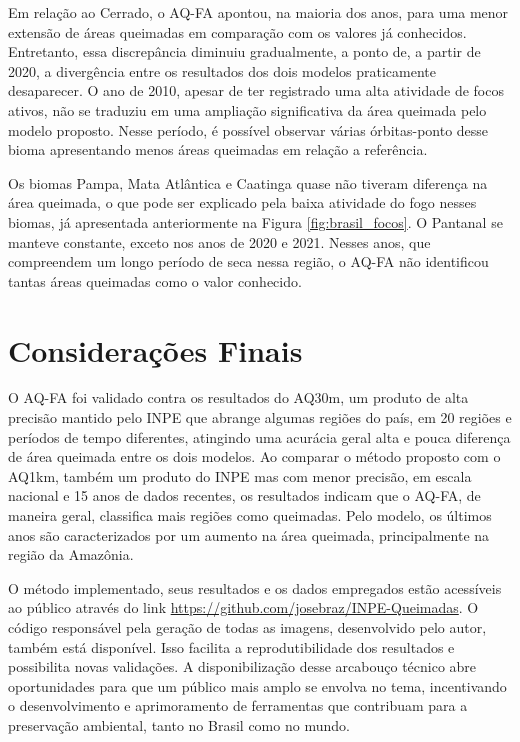 \documentclass[cic,tc]{iiufrgs}
\begin{document}
Em relação ao Cerrado, o AQ-FA apontou, na maioria dos anos, para uma menor extensão de áreas queimadas em comparação com os valores já conhecidos. Entretanto, essa discrepância diminuiu gradualmente, a ponto de, a partir de 2020, a divergência entre os resultados dos dois modelos praticamente desaparecer. O ano de 2010, apesar de ter registrado uma alta atividade de focos ativos, não se traduziu em uma ampliação significativa da área queimada pelo modelo proposto. Nesse período, é possível observar várias órbitas-ponto desse bioma apresentando menos áreas queimadas em relação a referência.

Os biomas Pampa, Mata Atlântica e Caatinga quase não tiveram diferença na área queimada, o que pode ser explicado pela baixa atividade do fogo nesses biomas, já apresentada anteriormente na Figura \ref{fig:brasil_focos}. O Pantanal se manteve constante, exceto nos anos de 2020 e 2021. Nesses anos, que compreendem um longo período de seca nessa região, o AQ-FA não identificou tantas áreas queimadas como o valor conhecido.



\chapter{Considerações Finais}
\label{chp:conclusa}



O AQ-FA foi validado contra os resultados do AQ30m, um produto de alta precisão mantido pelo INPE que abrange algumas regiões do país, em 20 regiões e períodos de tempo diferentes, atingindo uma acurácia geral alta e pouca diferença de área queimada entre os dois modelos. Ao comparar o método proposto com o AQ1km, também um produto do INPE mas com menor precisão, em escala nacional e 15 anos de dados recentes, os resultados indicam que o AQ-FA, de maneira geral, classifica mais regiões como queimadas. Pelo modelo, os últimos anos são caracterizados por um aumento na área queimada, principalmente na região da Amazônia.



O método implementado, seus resultados e os dados empregados estão acessíveis ao público através do link \url{https://github.com/josebraz/INPE-Queimadas}. O código responsável pela geração de todas as imagens, desenvolvido pelo autor, também está disponível. Isso facilita a reprodutibilidade dos resultados e possibilita novas validações. A disponibilização desse arcabouço técnico abre oportunidades para que um público mais amplo se envolva no tema, incentivando o desenvolvimento e aprimoramento de ferramentas que contribuam para a preservação ambiental, tanto no Brasil como no mundo.
\end{document}
